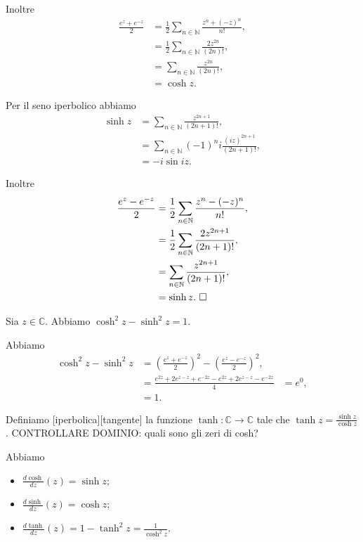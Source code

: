 \par Inoltre
\begin{align*}
  \frac{e^z + e^{-z}}{2}
  &= \frac{1}{2}
      \sum_{n \in \mathbb{N}} \frac{z^n + (-z)^n}{n!},\\
  &= \frac{1}{2}
      \sum_{n \in \mathbb{N}} \frac{2z^{2n}}{(2n)!},\\
  &= \sum_{n \in \mathbb{N}} \frac{z^{2n}}{(2n)!},\\
  &= \cosh z.
\end{align*}
\par Per il seno iperbolico abbiamo
\begin{align*}
  \sinh z
  &= \sum_{n \in \mathbb{N}} \frac{z^{2n + 1}}{(2n + 1)!},\\
  &= \sum_{n \in \mathbb{N}} (-1)^{n} i \frac{(iz)^{2n + 1}}{(2n + 1)!},\\
  &= - i \sin iz.
\end{align*}
\par Inoltre
\begin{align*}
  \frac{e^z - e^{-z}}{2}
  &= \frac{1}{2}
      \sum_{n \in \mathbb{N}} \frac{z^n - (-z)^n}{n!},\\
  &= \frac{1}{2}
      \sum_{n \in \mathbb{N}} \frac{2z^{2n + 1}}{(2n + 1)!},\\
  &= \sum_{n \in \mathbb{N}} \frac{z^{2n + 1}}{(2n + 1)!},\\
  &= \sinh z.\text{ $\square$}
\end{align*}
\begin{Corollary}
	Sia $z \in \mathbb{C}$. Abbiamo $\cosh^2 z - \sinh^2 z = 1$.
\end{Corollary}
\Proof Abbiamo
\begin{align*}
\cosh^2 z - \sinh^2 z
&= \left ( \frac{e^z + e^{-z}}{2} \right)^2
  - \left ( \frac{e^z - e^{-z}}{2} \right)^2,\\
&= \frac{e^{2z} + 2 e^{z-z} + e^{-2z} - e^{2z} + 2 e^{z-z} - e^{-2z}}
    {4}
&= e^0,\\
&= 1.
\end{align*}
\begin{Definition}
  Definiamo [iperbolica][tangente] la
  funzione
  $\tanh: \mathbb{C}
    \rightarrow \mathbb{C}$
  tale che $\tanh{z} = \frac{\sinh{z}}{\cosh{z}}$.
CONTROLLARE DOMINIO: quali sono gli zeri di cosh?
\end{Definition}
\begin{Theorem}
  Abbiamo
  \begin{itemize}
    \item $\frac{d\cosh}{dz}(z) = \sinh z$;
    \item $\frac{d\sinh}{dz}(z) = \cosh z$;
    \item $\frac{d\tanh}{dz}(z) = 1 - \tanh^2 z = \frac{1}{\cosh^2 z}$.
  \end{itemize}
\end{Theorem}
